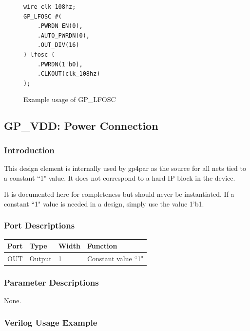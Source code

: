 \documentclass{article}
\begin{document}
\begin{figure}[h]
\begin{lstlisting}
wire clk_108hz;
GP_LFOSC #(
	.PWRDN_EN(0),
	.AUTO_PWRDN(0),
	.OUT_DIV(16)
) lfosc (
	.PWRDN(1'b0),
	.CLKOUT(clk_108hz)
);
\end{lstlisting}
\caption{Example usage of GP\_LFOSC}
\label{gp-lfosc-example}
\end{figure}


\FloatBarrier
\pagebreak
\subsection{GP\_VDD: Power Connection}

\subsubsection{Introduction}
This design element is internally used by gp4par as the source for all nets tied to a constant ``1" value. It does not 
correspond to a hard IP block in the device.

It is documented here for completeness but should never be instantiated. If a constant ``1" value is needed in a 
design, simply use the value 1'b1.

\subsubsection{Port Descriptions}

\begin{tabularx}{4in}{|l|l|l|X|}
\hline
{\bfseries Port} & {\bfseries Type} & {\bfseries Width} & {\bfseries Function} \\
\hline
OUT & Output & 1 & Constant value ``1" \\
\hline
\end{tabularx}

\subsubsection{Parameter Descriptions}

None.

\subsubsection{Verilog Usage Example}
\end{document}
